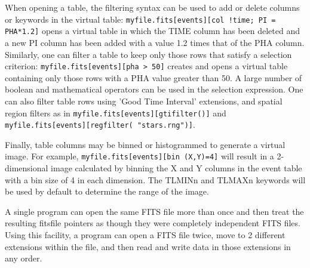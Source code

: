 \documentclass[11pt]{book}
\begin{document}
\begin{description}
When opening a table, the filtering syntax can be used to add or delete
columns or keywords in the virtual table:
\verb-myfile.fits[events][col !time; PI = PHA*1.2]- opens a virtual table in which the TIME column
has been deleted and a new PI column has been added with a value 1.2
times that of the PHA column. Similarly, one can filter a table to keep
only those rows that satisfy a selection criterion:
\verb-myfile.fits[events][pha > 50]- creates and opens a virtual table
containing only those rows with a PHA value greater than 50. A large
number of boolean and mathematical operators can be used in the
selection expression. One can also filter table rows using 'Good Time
Interval' extensions, and spatial region filters as in
\verb-myfile.fits[events][gtifilter()]- and
\verb-myfile.fits[events][regfilter( "stars.rng")]-.

Finally, table columns may be binned or histogrammed to generate a
virtual image. For example, \verb-myfile.fits[events][bin (X,Y)=4]- will
result in a 2-dimensional image calculated by binning the X and Y
columns in the event table with a bin size of 4 in each dimension. The
TLMINn and TLMAXn keywords will be used by default to determine the
range of the image.

A single program can open the same FITS file more than once and then
treat the resulting fitsfile pointers as though they were completely
independent FITS files. Using this facility, a program can open a FITS
file twice, move to 2 different extensions within the file, and then
 read and write data in those extensions in any order.
\end{description}
\end{document}
